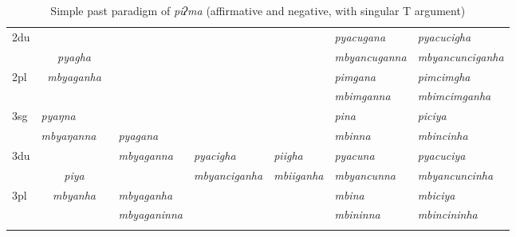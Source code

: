 \begin{landscape}
\begin{table}[p]
{\begin{tabular}{|l||p{2.4cm}|p{1.5cm}|p{2.4cm}|p{2.4cm}|p{2.4cm}|p{3.2cm}|p{3.2cm}|}
 \cline{1-2} \cline{7-8}			
{\sc 2du}		& 	\multicolumn{2}{c|}{}     &  \multicolumn{3}{c|}{\cellcolor[gray]{.8}} & \it  pyacugana  & \it   pyacucigha \\
		&  	\multicolumn{2}{c|}{\it  pyagha} &   \multicolumn{3}{c|}{\cellcolor[gray]{.8}}& \it mbyancuganna  & \it  mbyancunciganha \\
 \cline{1-1} \cline{7-8}			
{\sc 2pl}	& 	\multicolumn{2}{c|}{\it mbyaganha} &   \multicolumn{3}{c|}{ \cellcolor[gray]{.8}}& \it  pimgana& \it  pimcimgha  \\
		&  	\multicolumn{2}{c|}{ }&   \multicolumn{3}{c|}{\cellcolor[gray]{.8} }& \it  mbimganna & \it  mbimcimganha \\
\midrule			
{\sc 3sg}	& \it pyaŋna	  & \it 	      	& \it   			& \it     & \it     	& \it pina& \it piciya\\
		& \it  mbyaŋanna   & \it    	& \it  pyagana& \it   & \it    & \it mbinna& \it mbincinha\\
  \cline{1-2}  \cline{7-8}					
{\sc 3du}		&   \multicolumn{2}{c|}{}& \it mbyaganna& \it pyacigha & \it    piigha& \it   pyacuna & \it   pyacuciya\\
		&   \multicolumn{2}{c|}{\it piya}& \it   		& \it 		mbyanciganha	& \it  mbiiganha & \it  mbyancunna & \it  mbyancuncinha\\
 \cline{1-1} \cline{4-4} \cline{7-8}	
{\sc 3pl}		&\multicolumn{2}{c|}{\it mbyanha}& \it mbyaganha& \it & \it  & \it mbina& \it mbiciya\\	
	& \multicolumn{2}{c|}{ }& \it mbyaganinna& \it  & \it  & \it mbininna& \it mbincininha \\
\lspbottomrule
\end{tabular}
}
\caption{Simple past paradigm of \emph{piʔma}  (affirmative and negative, with singular T argument)}\label{par-pipma-pst}
\end{table}




\end{landscape}
